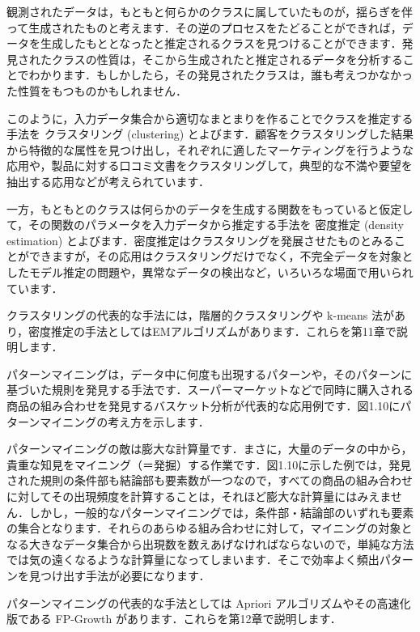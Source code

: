 観測されたデータは，もともと何らかのクラスに属していたものが，揺らぎを伴って生成されたものと考えます．その逆のプロセスをたどることができれば，データを生成したもととなったと推定されるクラスを見つけることができます．発見されたクラスの性質は，そこから生成されたと推定されるデータを分析することでわかります．もしかしたら，その発見されたクラスは，誰も考えつかなかった性質をもつものかもしれません．

このように，入力データ集合から適切なまとまりを作ることでクラスを推定する手法を
クラスタリング (clustering) 
とよびます．顧客をクラスタリングした結果から特徴的な属性を見つけ出し，それぞれに適したマーケティングを行うような応用や，製品に対する口コミ文書をクラスタリングして，典型的な不満や要望を抽出する応用などが考えられています．

一方，もともとのクラスは何らかのデータを生成する関数をもっていると仮定して，その関数のパラメータを入力データから推定する手法を
密度推定  (density estimation) 
とよびます．密度推定はクラスタリングを発展させたものとみることができますが，その応用はクラスタリングだけでなく，不完全データを対象としたモデル推定の問題や，異常なデータの検出など，いろいろな場面で用いられています．

クラスタリングの代表的な手法には，階層的クラスタリングや k-means 法があり，密度推定の手法としてはEMアルゴリズムがあります．これらを第11章で説明します．


パターンマイニングは，データ中に何度も出現するパターンや，そのパターンに基づいた規則を発見する手法です．スーパーマーケットなどで同時に購入される商品の組み合わせを発見するバスケット分析が代表的な応用例です．図1.10にパターンマイニングの考え方を示します．

パターンマイニングの敵は膨大な計算量です．まさに，大量のデータの中から，貴重な知見をマイニング（＝発掘）する作業です．図1.10に示した例では，発見された規則の条件部も結論部も要素数が一つなので，すべての商品の組み合わせに対してその出現頻度を計算することは，それほど膨大な計算量にはみえません．しかし，一般的なパターンマイニングでは，条件部・結論部のいずれも要素の集合となります．それらのあらゆる組み合わせに対して，マイニングの対象となる大きなデータ集合から出現数を数えあげなければならないので，単純な方法では気の遠くなるような計算量になってしまいます．そこで効率よく頻出パターンを見つけ出す手法が必要になります．

パターンマイニングの代表的な手法としては Apriori アルゴリズムやその高速化版である FP-Growth があります．これらを第12章で説明します．


